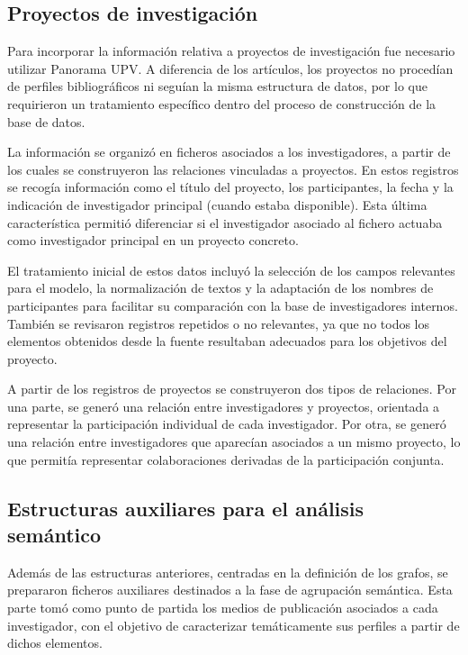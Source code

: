 \documentclass[11pt,spanish,listoffigures,listoftables]{tfgetsinf}
\begin{document}
\subsection{Proyectos de investigación}

Para incorporar la información relativa a proyectos de investigación fue necesario utilizar Panorama UPV. A diferencia de los artículos, los proyectos no procedían de perfiles bibliográficos ni seguían la misma estructura de datos, por lo que requirieron un tratamiento específico dentro del proceso de construcción de la base de datos.

La información se organizó en ficheros asociados a los investigadores, a partir de los cuales se construyeron las relaciones vinculadas a proyectos. En estos registros se recogía información como el título del proyecto, los participantes, la fecha y la indicación de investigador principal (cuando estaba disponible). Esta última característica permitió diferenciar si el investigador asociado al fichero actuaba como investigador principal en un proyecto concreto.

El tratamiento inicial de estos datos incluyó la selección de los campos relevantes para el modelo, la normalización de textos y la adaptación de los nombres de participantes para facilitar su comparación con la base de investigadores internos. También se revisaron registros repetidos o no relevantes, ya que no todos los elementos obtenidos desde la fuente resultaban adecuados para los objetivos del proyecto.

A partir de los registros de proyectos se construyeron dos tipos de relaciones. Por una parte, se generó una relación entre investigadores y proyectos, orientada a representar la participación individual de cada investigador. Por otra, se generó una relación entre investigadores que aparecían asociados a un mismo proyecto, lo que permitía representar colaboraciones derivadas de la participación conjunta.

\subsection{Estructuras auxiliares para el análisis semántico}

Además de las estructuras anteriores, centradas en la definición de los grafos, se prepararon ficheros auxiliares destinados a la fase de agrupación semántica. Esta parte tomó como punto de partida los medios de publicación asociados a cada investigador, con el objetivo de caracterizar temáticamente sus perfiles a partir de dichos elementos.
\end{document}
